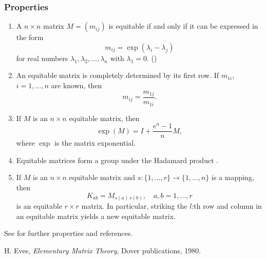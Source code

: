 \documentclass[12pt]{article}
\begin{document}
\subsubsection*{Properties}
\begin{enumerate}
\item A $n \times n$ matrix $M=(m_{ij})$ is equitable if and 
only if it can be expressed in the form
$$
  m_{ij} = \exp (\lambda_i - \lambda_j)
$$
for real numbers $\lambda_1, \lambda_2, \ldots, \lambda_n$ with $\lambda_1 = 0$. ()
\item An equitable matrix is completely determined by its first row. 
If $m_{1i}$, $i=1, \ldots, n$ are known, then 
$$
   m_{ij} = \frac{m_{1j}}{m_{1i}}.
$$
\item If $M$ is an $n\times n$ equitable matrix, then 
$$
  \operatorname{exp}(M) = I + \frac{e^n-1}{n} M,
$$
where $\operatorname{exp}$ is the matrix exponential. 
\item Equitable matrices form a group under the Hadamard product \cite{eves}.
\item If $M$ is an $n\times n$ equitable matrix and $s\colon \{1,\ldots, r\}\to \{1, \ldots, n\}$
is a mapping, then 
$$
   K_{ab} = M_{s(a)\, s(b)}, \quad a,b=1,\ldots, r
$$
is an equitable $r\times r$ matrix. In particular, striking the $l$:th row and column in an 
equitable matrix yields a new equitable matrix. 
\end{enumerate}

See \cite{eves} for further properties and references.

\begin{thebibliography}{9}
 H. Eves, \emph{Elementary Matrix Theory}, Dover publications, 1980.
\end{thebibliography}
\end{document}
